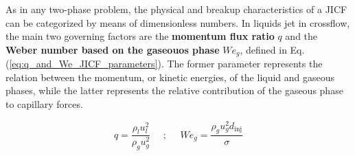 As in any two-phase problem, the physical and breakup characteristics of a JICF can be categorized by means of dimensionless numbers. In liquids jet in crossflow, the main two governing factors are the \textbf{momentum flux ratio} $q$ and the \textbf{Weber number based on the gaseouos phase} $We_g$, defined in Eq. (\ref{eq:q_and_We_JICF_parameters}). The former parameter represents the relation between the momentum, or kinetic energies, of the liquid and gaseous phases, while the latter represents the relative contribution of the gaseous phase to capillary forces. 

\begin{equation}
\label{eq:q_and_We_JICF_parameters}
	q = \frac{\rho_l u_l^2}{\rho_g u_g^2} ~~~~~~ ;  ~~~~~~ We_g = \frac{\rho_g u_g^2 d_\mathrm{inj}}{\sigma}
\end{equation}

